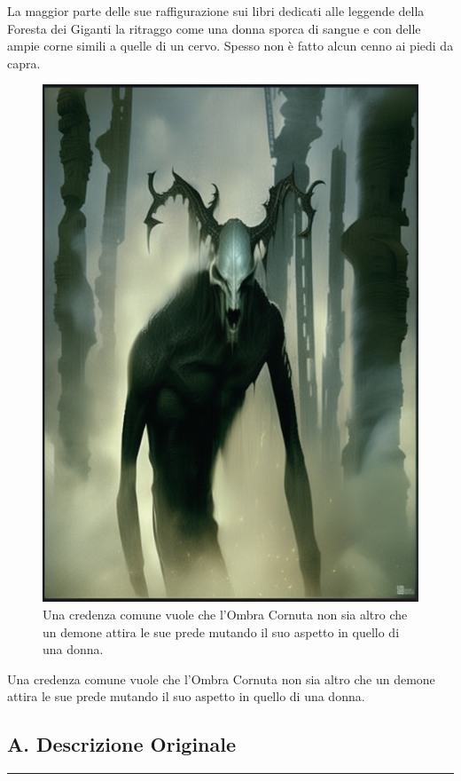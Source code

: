 La maggior parte delle sue raffigurazione sui libri dedicati alle
leggende della Foresta dei Giganti la ritraggo come una donna sporca di
sangue e con delle ampie corne simili a quelle di un cervo. Spesso non è
fatto alcun cenno ai piedi da capra.

\begin{figure}
\centering
\includegraphics{demon-sf-intricate-artwork-masterpiece-ominous-matte-painting-movie-poster-golden-ratio-trendi.png}
\caption{Una credenza comune vuole che l'Ombra Cornuta non sia altro che
un demone attira le sue prede mutando il suo aspetto in quello di una
donna.}
\end{figure}

Una credenza comune vuole che l'Ombra Cornuta non sia altro che un
demone attira le sue prede mutando il suo aspetto in quello di una
donna.

\subsection{A. Descrizione Originale}\label{a.-descrizione-originale}

\begin{center}\rule{0.5\linewidth}{0.5pt}\end{center}
